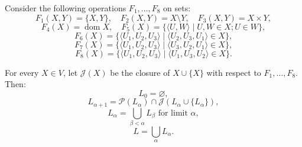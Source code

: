 Consider the following operations $F_1, \ldots, F_8$ on sets:
$$F_1(X, Y) = \{X, Y\},\quad F_2(X, Y) = X \setminus Y,\quad F_3(X, Y) = X \times Y,$$
$$F_4(X) = \operatorname{dom} X,\quad F_5(X) = \{\langle U, W \rangle \mid U, W \in X; U \in W\},$$
$$F_6(X) = \{\langle U_1, U_2, U_3 \rangle \mid \langle U_2, U_3, U_1 \rangle \in X\},$$
$$F_7(X) = \{\langle U_1, U_2, U_3 \rangle \mid \langle U_3, U_2, U_1 \rangle \in X\},$$
$$F_8(X) = \{\langle U_1, U_2, U_3 \rangle \mid \langle U_1, U_3, U_2 \rangle \in X\}.$$

For every $X \in V$, let $\mathcal{J}(X)$ be the closure of $X \cup \{X\}$ with respect to $F_1, \ldots, F_8$. Then:
$$L_0 = \varnothing,$$
$$L_{\alpha+1} = \mathcal{P}(L_\alpha) \cap \mathcal{J}(L_\alpha \cup \{L_\alpha\}),$$
$$L_\alpha = \bigcup_{\beta < \alpha} L_\beta \text{ for limit } \alpha,$$
$$L = \bigcup_{\alpha} L_\alpha.$$